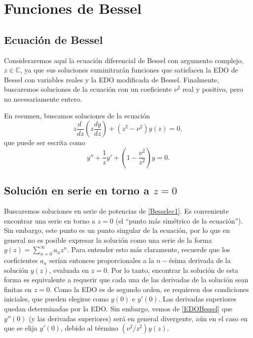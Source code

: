 \chapter{Funciones de Bessel}\label{capBessel}
\section{Ecuación de Bessel}
Consideraremos aquí la ecuación diferencial de Bessel con argumento complejo, $z\in\mathbb{C}$, ya que sus soluciones suminitrarán funciones que satisfacen la EDO de Bessel con variables reales y la EDO modificada de Bessel. Finalmente, buscaremos soluciones de la ecuación con un coeficiente $\nu^ 2$ real y positivo, pero no necesariamente entero.

En resumen, buscamos soluciones de la ecuación
\begin{equation}\label{Besselec1}
z\frac{d\ }{dz}\left(z\frac{dy}{dz}\right)+(z^2-\nu^2)y(z)=0,
\end{equation}
que puede ser escrita como
\begin{equation}\label{EDOBessel}
y'' + \frac{1}{z} y' + \left( 1 - \frac{\nu^2}{z^2} \right)y = 0.
\end{equation}


\section{Solución en serie en torno a $z = 0$}\label{secsolBess}
Buscaremos soluciones en serie de potencias de \eqref{Besselec1}. Es conveniente encontrar una serie en torno a $z=0$ (el ``punto más simétrico de la ecuación''). Sin embargo, este punto es un punto singular de la ecuación, por lo que en general no es posible expresar la solución como una serie de la forma $y(z) = \sum_{n=0}^\infty a_n z^n$. Para entender esto más claramente, recuerde que los coeficientes $a_n$ serían entonces proporcionales a la $n-$ésima derivada de la solución $y(z)$, evaluada en $z=0$. Por lo tanto, encontrar la solución de esta forma es equivalente a requerir que cada una de las derivadas de la solución sean finitas en $z=0$. Como la EDO es de segundo orden, se requieren dos condiciones iniciales, que pueden elegirse como $y(0)$ e $y'(0)$. Las derivadas superiores quedan determinadas por la EDO. Sin embargo, vemos de \eqref{EDOBessel} que $y''(0)$ (y las derivadas superiores) será en general divergente, aún en el caso en que se elija $y'(0)$, debido al término $({\nu^2}/{z^2})y(z)$. 

